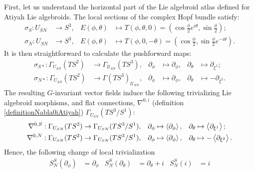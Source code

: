 First, let us understand the horizontal part of the Lie algebroid atlas defined for Atiyah Lie algebroids. The local sections of the complex Hopf bundle satisfy:
\begin{align*}
    \sigma_S : U_{SN} &\to S^3, &       E(\phi, \theta) &\mapsto T(\phi, \theta, 0) = (\cos \frac{\phi}{2} e^{i \theta}, \sin \frac{\phi}{2} );\\
    \sigma_N : U_{SN} &\to S^3, &       E(\phi, \theta) &\mapsto T(\phi, 0, -\theta) = (\cos \frac{\phi}{2} , \sin \frac{\phi}{2} e^{-i \theta}).
\end{align*}
It is then straightforward to calculate the pushforward maps:
\begin{align*}
    \sigma_{S*} : \Gamma_{U_{SN}}(TS^2) &\to \Gamma_{\mathcal U_{SN}}(TS^3), & \partial_\phi &\mapsto \partial_\phi, & \partial_\theta &\mapsto \partial_{\xi^1};   \\
    \sigma_{N*} : \Gamma_{U_{SN}}(TS^2) &\to \Gamma(TS^3)_{\mathcal U_{SN}}, & \partial_\phi &\mapsto \partial_\phi, & \partial_\theta &\mapsto -\partial_{\xi^2}.
\end{align*}
The resulting $G$-invariant vector fields induce the following trivializing Lie algebroid morphisms, and flat connections, $\nabla^{0,i}$ (definition \ref{definitionNabla0iAtiyah}) $\Gamma_{U_{SN}}(TS^3/S^1)$:
\begin{align}
    \nabla^{0,S} : \Gamma_{U_{SN}}(TS^2) &\to \Gamma_{U_{SN}}(TS^3/S^1), & \partial_\phi &\mapsto \cl{\partial_\phi}, & \partial_\theta &\mapsto \cl{\partial_{\xi^1}};   \\
    \nabla^{0,N} : \Gamma_{U_{SN}}(TS^2) &\to \Gamma_{U_{SN}}(TS^3/S^1), & \partial_\phi &\mapsto \cl{\partial_\phi}, & \partial_\theta &\mapsto -\cl{\partial_{\xi^2}}.
\end{align}
Hence, the following change of local trivialization
\begin{align*}
    S^S_N(\partial_\phi) &= \partial_\phi &  S^S_N(\partial_\theta) &= \partial_\theta + i & S^S_N(i) &= i
\end{align*}

